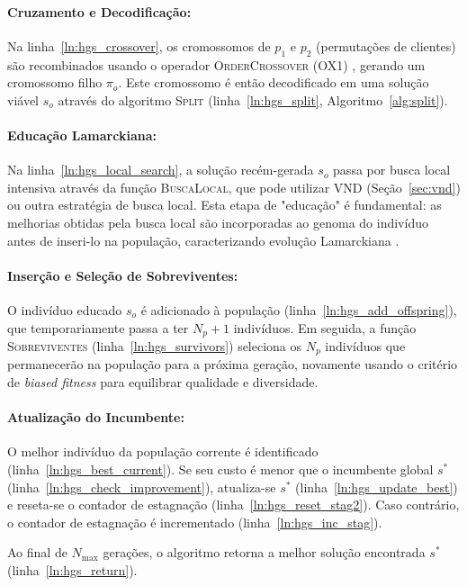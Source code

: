 \paragraph{Cruzamento e Decodificação:} Na linha~\ref{ln:hgs_crossover}, os cromossomos de $p_1$ e $p_2$ (permutações de clientes) são recombinados usando o operador \textsc{OrderCrossover} (OX1) \cite{davis1985applying}, gerando um cromossomo filho $\pi_o$. Este cromossomo é então decodificado em uma solução viável $s_o$ através do algoritmo \textsc{Split} (linha~\ref{ln:hgs_split}, Algoritmo~\ref{alg:split}).

\paragraph{Educação Lamarckiana:} Na linha~\ref{ln:hgs_local_search}, a solução recém-gerada $s_o$ passa por busca local intensiva através da função \textsc{BuscaLocal}, que pode utilizar VND (Seção~\ref{sec:vnd}) ou outra estratégia de busca local. Esta etapa de "educação" é fundamental: as melhorias obtidas pela busca local são incorporadas ao genoma do indivíduo antes de inseri-lo na população, caracterizando evolução Lamarckiana \cite{vidal2013}.

\paragraph{Inserção e Seleção de Sobreviventes:} O indivíduo educado $s_o$ é adicionado à população (linha~\ref{ln:hgs_add_offspring}), que temporariamente passa a ter $N_p + 1$ indivíduos. Em seguida, a função \textsc{Sobreviventes} (linha~\ref{ln:hgs_survivors}) seleciona os $N_p$ indivíduos que permanecerão na população para a próxima geração, novamente usando o critério de \emph{biased fitness} para equilibrar qualidade e diversidade.

\paragraph{Atualização do Incumbente:} O melhor indivíduo da população corrente é identificado (linha~\ref{ln:hgs_best_current}). Se seu custo é menor que o incumbente global $s^*$ (linha~\ref{ln:hgs_check_improvement}), atualiza-se $s^*$ (linha~\ref{ln:hgs_update_best}) e reseta-se o contador de estagnação (linha~\ref{ln:hgs_reset_stag2}). Caso contrário, o contador de estagnação é incrementado (linha~\ref{ln:hgs_inc_stag}).

Ao final de $N_{\max}$ gerações, o algoritmo retorna a melhor solução encontrada $s^*$ (linha~\ref{ln:hgs_return}).

